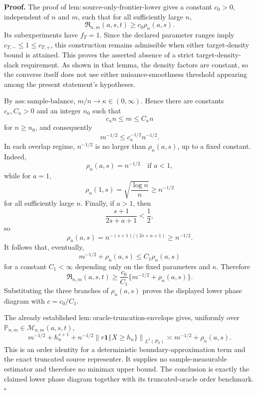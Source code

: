 \textbf{Proof.}
The proof of \(\mathrm{lem:source\text{-}only\text{-}frontier\text{-}lower}\) gives a constant \(c_0>0\), independent of \(n\) and \(m\), such that for all sufficiently large \(n\),
\[
 \mathfrak R_{n,m}(a,s,t)\ge c_0\rho_n(a,s).
\]
Its subexperiments have \(f_T=1\).  Since the declared parameter ranges imply \(c_{T,-}\le1\le c_{T,+}\), this construction remains admissible when either target-density bound is attained.  This proves the asserted absence of a strict target-density-slack requirement.  As shown in that lemma, the density factors are constant, so the converse itself does not use either nuisance-smoothness threshold appearing among the present statement's hypotheses.

By \(\mathrm{ass:sample\text{-}balance}\), \(m/n\to\kappa\in(0,\infty)\).  Hence there are constants \(c_\kappa,C_\kappa>0\) and an integer \(n_0\) such that
\[
 c_\kappa n\le m\le C_\kappa n
\]
for \(n\ge n_0\), and consequently
\[
 m^{-1/2}\le c_\kappa^{-1/2}n^{-1/2}.
\]
In each overlap regime, \(n^{-1/2}\) is no larger than \(\rho_n(a,s)\), up to a fixed constant.  Indeed,
\[
 \rho_n(a,s)=n^{-1/2}\quad\text{if }a<1,
\]
while for \(a=1\),
\[
 \rho_n(1,s)=\sqrt{\frac{\log n}{n}}\ge n^{-1/2}
\]
for all sufficiently large \(n\).  Finally, if \(a>1\), then
\[
 \frac{s+1}{2s+a+1}<\frac12,
\]
so
\[
 \rho_n(a,s)=n^{-(s+1)/(2s+a+1)}\ge n^{-1/2}.
\]
It follows that, eventually,
\[
 m^{-1/2}+\rho_n(a,s)\le C_1\rho_n(a,s)
\]
for a constant \(C_1<\infty\) depending only on the fixed parameters and \(\kappa\).  Therefore
\[
 \mathfrak R_{n,m}(a,s,t)
 \ge \frac{c_0}{C_1}\{m^{-1/2}+\rho_n(a,s)\}.
\]
Substituting the three branches of \(\rho_n(a,s)\) proves the displayed lower phase diagram with \(c=c_0/C_1\).

The already established \(\mathrm{lem:oracle\text{-}truncation\text{-}envelope}\) gives, uniformly over \(\mathbb P_{n,m}\in\mathcal M_{n,m}(a,s,t)\),
\[
 m^{-1/2}+h_n^{s+1}
 +n^{-1/2}\left\|r\mathbf 1\{X\ge h_n\}\right\|_{L^2(P_S)}
 \asymp m^{-1/2}+\rho_n(a,s).
\]
This is an order identity for a deterministic boundary-approximation term and the exact truncated source representer.  It supplies no sample-measurable estimator and therefore no minimax upper bound.  The conclusion is exactly the claimed lower phase diagram together with its truncated-oracle order benchmark. \(\square\)